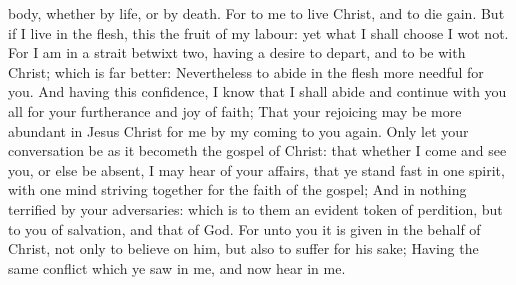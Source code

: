{body,
whether
{}
by
life,
or
by
death.
For to
me to
live
{}
Christ,
and to
die
{}
gain.
But
if I
live
in the
flesh,
this
{} the
fruit
of
my
labour:
yet
what I shall
choose I
wot
not.
For I am in a
strait
betwixt
two,
having a
desire
to
depart,
and to
be
with
Christ; which
is
far
better:
Nevertheless to
abide
in the
flesh
{} more
needful
for
you.
And
having
this
confidence, I
know
that I shall
abide
and continue
with
you
all
for
your
furtherance
and
joy of
faith;
That
your
rejoicing may be more
abundant
in
Jesus
Christ
for
me
by
my
coming
to
you
again.
Only let your conversation
be as it
becometh the
gospel of
Christ:
that
whether I
come
and
see
you, or
else be
absent, I may
hear of
your
affairs,
that ye stand
fast
in
one
spirit,
with
one
mind striving
together for the
faith of the
gospel;
And
in
nothing
terrified
by your
adversaries:
which
is to
them an evident
token of
perdition,
but to
you of
salvation,
and
that
of
God.
For unto
you it is
given in the
behalf of
Christ,
not
only to
believe
on
him,
but
also to
suffer
for
his
sake;
Having
the
same
conflict
which ye
saw
in
me,
and
now
hear
{}
in
me.

}
